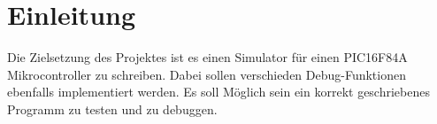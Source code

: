 \chapter{Einleitung}			%

Die Zielsetzung des Projektes ist es einen Simulator f\"ur einen PIC16F84A Mikrocontroller zu schreiben. Dabei sollen verschieden Debug-Funktionen ebenfalls implementiert werden. Es soll M\"oglich sein ein korrekt geschriebenes Programm zu testen und zu debuggen.

